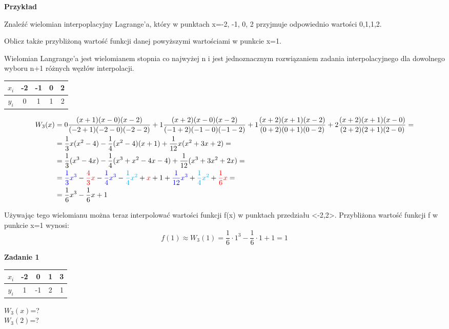 \documentclass[10pt, a4paper]{article}
\begin{document}
\textbf{Przykład}

Znaleźć wielomian interpoplacyjny Lagrange'a, który w punktach x=-2, -1, 0, 2 przyjmuje odpowiednio wartości 0,1,1,2.

Oblicz także przybliżoną wartość funkcji danej powyższymi wartościami w punkcie x=1.

\begin{mdframed}
Wielomian Langrange'a jest wielomianem stopnia co najwyżej n i jest jednoznacznym rozwiązaniem zadania interpolacyjnego dla dowolnego wyboru n+1 różnych węzłów interpolacji.
\end{mdframed}

\begin{center}
\begin{tabular}{|c|c|c|c|c|}
\hline
$x_i$ & -2 & -1 & 0 & 2\\
\hline
$y_i$ & 0 & 1 & 1 & 2 \\
\hline
\end{tabular}
\end{center}

\begin{align*}
W_3(x)&=0\frac{(x+1)(x-0)(x-2)}{(-2+1)(-2-0)(-2-2)}+1\frac{(x+2)(x-0)(x-2)}{(-1+2)(-1-0)(-1-2)}+1\frac{(x+2)(x+1)(x-2)}{(0+2)(0+1)(0-2)}+2\frac{(x+2)(x+1)(x-0)}{(2+2)(2+1)(2-0)}=\\
&=\frac{1}{3}x(x^2-4)-\frac{1}{4}(x^2-4)(x+1)+\frac{1}{12}x(x^2+3x+2)=\\
&=\frac{1}{3}(x^3-4x)-\frac{1}{4}(x^3+x^2-4x-4)+\frac{1}{12}(x^3+3x^2+2x)=\\
&=\textcolor{blue}{\frac{1}{3}x^3}-\textcolor{red}{\frac{4}{3}x}-\textcolor{blue}{\frac{1}{4}x^3}-\textcolor{cyan}{\frac{1}{4}x^2}+\textcolor{red}x+1+\textcolor{blue}{\frac{1}{12}x^3}+\textcolor{cyan}{\frac{1}{4}x^2}+\textcolor{red}{\frac{1}{6}x}=\\
&=\frac{1}{6}x^3-\frac{1}{6}x+1
\end{align*}

Używając tego wielomianu można teraz interpolować wartości funkcji f(x) w punktach przedziału <-2,2>. Przybliżona wartość funkcji f w punkcie x=1 wynosi: \[f(1)\approx W_3(1)=\frac{1}{6}\cdot1^3-\frac{1}{6}\cdot1+1=1\]

\textbf{Zadanie 1}

\begin{center}
\begin{tabular}{|c|c|c|c|c|}
\hline
$x_i$ & -2 & 0 & 1 & 3\\
\hline
$y_i$ & 1 & -1 & 2 & 1\\
\hline
\end{tabular}

$W_3(x)$=?\\
$W_3(2)$=?
\end{center}
\end{document}
